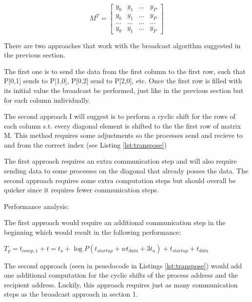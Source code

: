 \documentclass[a4paper]{exam}
\begin{document}
\begin{questions}
\begin{solution}
\begin{equation*} M^T =
  \begin{bmatrix}
    y_0 & y_1 & ... &y_P\\
    y_0 & y_1 & ... &y_P\\
    ... & ... & ... &...\\
    y_0 & y_1 & ... &y_P
  \end{bmatrix}
\end{equation*}

There are two approaches that work with the broadcast algorithm suggested in the previous section.

The first one is to send the data from the first column to the first row, such that P[0,1] sends to P[1,0], P[0,2] send to P[2,0], etc. Once the first row is filled with its initial value the broadcast be performed, just like in the previous section but for each column individually.

The second approach I will suggest is to perform a cyclic shift for the rows of each column s.t. every diagonal element is shifted to the the first row of matrix M. This method requires some adjustments so the processes send and recieve to and from the correct index (see Listing \ref{lst:transpose})

The first approach requires an extra communication step and will also require sending data to some processes on the diagonal that already posses the data. The second approach requires some extra computation steps but should overall be quicker since it requires fewer communication steps.
\end{solution}



\addpoints \question Performance analysis:

The first approach would require an additional communication step in the beginning which would result in the following performance:

$T_p = t_{comp,1} + t = t_a + \log P(t_{startup} + wt_{data} + 3t_a) + t_{startup} + t_{data}$

The second approach (seen in psuedocode in Listings \ref{lst:transpose}) would add one additional computation for the cyclic shifts of the process address and the recipient address. Luckily, this approach requires just as many communication steps as the broadcast approach in section 1.


\end{questions}
\end{document}
